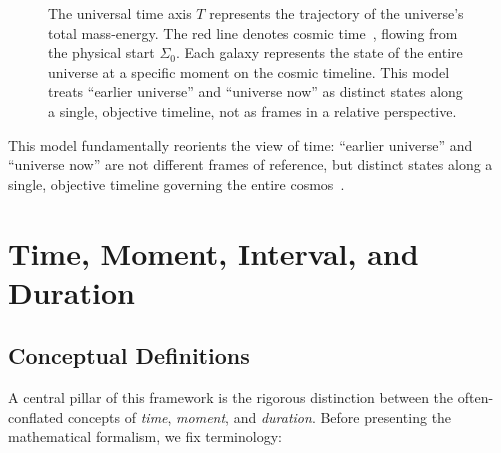 \documentclass[12pt]{article}
\theoremstyle{plain} %
\begin{document}
\begin{figure}[h]
    \caption{The universal time axis $T$ represents the trajectory of the universe's total mass-energy. The red line denotes cosmic time~\cite{Minkowski1908}, flowing from the physical start $\Sigma_0$. Each galaxy represents the state of the entire universe at a specific moment on the cosmic timeline. This model treats ``earlier universe'' and ``universe now'' as distinct states along a single, objective timeline, not as frames in a relative perspective.}
    \label{fig:t-axis}
\end{figure}

\noindent This model fundamentally reorients the view of time: “earlier universe” and “universe now” are not different frames of reference, but distinct states along a single, objective timeline governing the entire cosmos~\cite{Mermin1984}.


\section{Time, Moment, Interval, and Duration}

\subsection*{Conceptual Definitions}

A central pillar of this framework is the rigorous distinction between the often-conflated concepts of \emph{time}, \emph{moment}, and \emph{duration}. Before presenting the mathematical formalism, we fix terminology:
\end{document}
